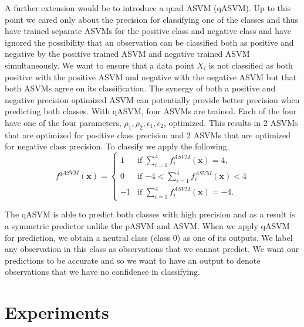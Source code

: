 \documentclass[twoside,11pt]{article}
\begin{document}
A further extension would be to introduce a quad ASVM (qASVM). Up to this point we cared only about the precision for classifying one of the classes and thus have trained separate ASVMs for the positive class and negative class and have ignored the possibility that an observation can be classified both as positive and negative by the positive trained ASVM and negative trained ASVM simultaneously. We want to ensure that a data point $X_i$ is not classified as both positive with the positive ASVM and negative with the negative ASVM but that both ASVMs agree on its classification. The synergy of both a positive and negative precision optimized ASVM can potentially provide better precision when predicting both classes. With qASVM, four ASVMs are trained. Each of the four have one of the four parameters, $\rho_1,\rho_2,\epsilon_1,\epsilon_2$, optimized. This results in 2 ASVMs that are optimized for positive class precision and 2 ASVMs that are optimized for negative class precision. To classify we apply the following.
\begin{equation}
	f^{qASVM}(\mathbf{x})=\begin{cases} 1 & \text{if $\sum_{i=1}^4 f^{ASVM}_i(\mathbf{x}) = 4$,}
\\
0 & \text{if $-4 <\sum_{i=1}^4 f^{ASVM}_i(\mathbf{x})<4$}\\
 -1  &\text{if $\sum_{i=1}^4 f^{ASVM}_i(\mathbf{x})=-4$.}
	\end{cases}
\end{equation}

The qASVM is able to predict both classes with high precision and as a result is a symmetric predictor unlike the pASVM and ASVM. When we apply qASVM for prediction, we obtain a neutral class (class 0) as one of its outputs. We label any observation in this class as observations that we cannot predict. We want our predictions to be accurate and so we want to have an output to denote observations that we have no confidence in classifying.

\section{Experiments}
\end{document}
